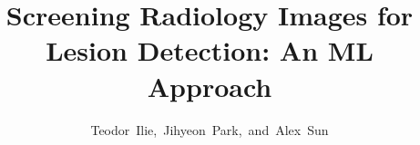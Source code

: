 


\documentclass[journal]{IEEEtran}

\usepackage{xcolor,soul,framed} %

\usepackage[pdftex]{graphicx}
\graphicspath{{../images/}}

\usepackage[cmex10]{amsmath}
\usepackage{array}
\usepackage{mdwmath}
\usepackage{mdwtab}
\usepackage{eqparbox}
\usepackage{url}





    \title{Screening  Radiology  Images  for Lesion  Detection: An ML Approach}
  \author{Teodor~Ilie,~Jihyeon~Park,~and~Alex~Sun%

}  

\markboth{}{}

\maketitle


